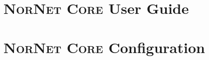 \documentclass[11pt,a4paper,norsk,german,english,titlepage]{book}
\theoremstyle{definition}
\newcommand{\noun}[1]{\textsc{#1}}
\begin{document}
% 

\pagestyle{plain}
\maketitle







\tableofcontents
\cleardoublepage

\printnomenclature
{}
\cleardoublepage


\pagestyle{headings}


\part{\noun{NorNet Core} User Guide}


% 
%
% 

\part{\noun{NorNet Core} Configuration}
\label{prt:Configuration}

\end{document}
